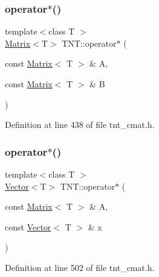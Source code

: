 \subsubsection{\texorpdfstring{operator$\ast$()}{operator*()}\hspace{0.1cm}{\footnotesize\ttfamily [7/8]}}
{\footnotesize\ttfamily template$<$class T $>$ \\
\hyperlink{classTNT_1_1Matrix}{Matrix}$<$T$>$ T\+N\+T\+::operator$\ast$ (\begin{DoxyParamCaption}\item[{const \hyperlink{classTNT_1_1Matrix}{Matrix}$<$ T $>$ \&}]{A,  }\item[{const \hyperlink{classTNT_1_1Matrix}{Matrix}$<$ T $>$ \&}]{B }\end{DoxyParamCaption})\hspace{0.3cm}{\ttfamily [inline]}}



Definition at line 438 of file tnt\+\_\+cmat.\+h.

\mbox{\label{namespaceTNT_aa7eda7fc4788d38da2e89bdd2c77d4bd}} 
\subsubsection{\texorpdfstring{operator$\ast$()}{operator*()}\hspace{0.1cm}{\footnotesize\ttfamily [8/8]}}
{\footnotesize\ttfamily template$<$class T $>$ \\
\hyperlink{classTNT_1_1Vector}{Vector}$<$T$>$ T\+N\+T\+::operator$\ast$ (\begin{DoxyParamCaption}\item[{const \hyperlink{classTNT_1_1Matrix}{Matrix}$<$ T $>$ \&}]{A,  }\item[{const \hyperlink{classTNT_1_1Vector}{Vector}$<$ T $>$ \&}]{x }\end{DoxyParamCaption})\hspace{0.3cm}{\ttfamily [inline]}}



Definition at line 502 of file tnt\+\_\+cmat.\+h.

\mbox{\label{namespaceTNT_a89bc7f14ed053648fc3cccef34955019}} 
